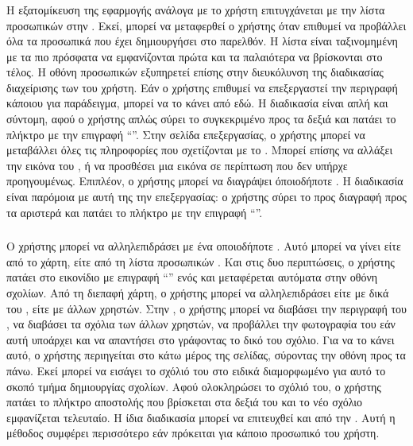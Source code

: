 \subsubsection{}
Η εξατομίκευση της εφαρμογής ανάλογα με το χρήστη επιτυγχάνεται με την λίστα προσωπικών  στην . Εκεί, μπορεί να μεταφερθεί ο χρήστης όταν επιθυμεί να προβάλλει όλα τα προσωπικά  που έχει δημιουργήσει στο παρελθόν. Η λίστα είναι ταξινομημένη με τα πιο πρόσφατα   να εμφανίζονται πρώτα και τα παλαιότερα να βρίσκονται στο τέλος. 
\newline
\indent
Η οθόνη προσωπικών   εξυπηρετεί επίσης στην διευκόλυνση της διαδικασίας διαχείρισης των   του χρήστη. Εάν ο χρήστης επιθυμεί να επεξεργαστεί την περιγραφή κάποιου  για παράδειγμα, μπορεί να το κάνει από εδώ. Η διαδικασία είναι απλή και σύντομη, αφού ο χρήστης απλώς σύρει το συγκεκριμένο  προς τα δεξιά και πατάει το πλήκτρο με την επιγραφή ``''. Στην σελίδα επεξεργασίας, ο χρήστης μπορεί να μεταβάλλει όλες τις πληροφορίες που σχετίζονται με το . Μπορεί επίσης να αλλάξει την εικόνα του , ή να προσθέσει μια εικόνα σε περίπτωση που δεν υπήρχε προηγουμένως. Επιπλέον, ο χρήστης μπορεί να διαγράψει όποιοδήποτε . Η διαδικασία είναι παρόμοια με αυτή της την επεξεργασίας: ο χρήστης σύρει το  προς διαγραφή προς τα αριστερά και πατάει το πλήκτρο με την επιγραφή ``''.



\subsubsection{}
Ο χρήστης μπορεί να αλληλεπιδράσει με ένα οποιοδήποτε . Αυτό μπορεί να γίνει είτε από το χάρτη, είτε από τη λίστα προσωπικών . Και στις δυο περιπτώσεις, ο χρήστης πατάει στο εικονίδιο με επιγραφή ``'' ενός  και μεταφέρεται αυτόματα στην οθόνη σχολίων. 
\newline
\indent
Από τη διεπαφή χάρτη, ο χρήστης μπορεί να αλληλεπιδράσει είτε με δικά του , είτε με  άλλων χρηστών. Στην , ο χρήστης μπορεί να διαβάσει την περιγραφή του , να διαβάσει τα σχόλια των άλλων χρηστών, να προβάλλει την φωτογραφία του  εάν αυτή υποάρχει και να απαντήσει στο  γράφοντας το δικό του σχόλιο. Για να το κάνει αυτό, ο χρήστης περιηγείται στο κάτω μέρος της σελίδας, σύροντας την οθόνη προς τα πάνω. Εκεί μπορεί να εισάγει το σχόλιό του στο ειδικά διαμορφωμένο για αυτό το σκοπό τμήμα δημιουργίας σχολίων. Αφού ολοκληρώσει το σχόλιό του, ο χρήστης πατάει το πλήκτρο αποστολής που βρίσκεται στα δεξιά του  και το νέο σχόλιο εμφανίζεται τελευταίο.
\newline
\indent
Η ίδια διαδικασία μπορεί να επιτευχθεί και από την . Αυτή η μέθοδος συμφέρει περισσότερο εάν πρόκειται για κάποιο προσωπικό  του χρήστη.

